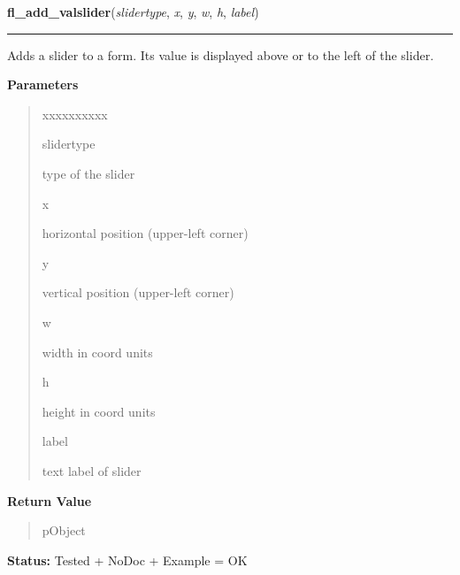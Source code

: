     \label{xformslib:library:fl_add_valslider}

    \vspace{0.5ex}

\hspace{.8\funcindent}\begin{boxedminipage}{\funcwidth}

    \raggedright \textbf{fl\_add\_valslider}(\textit{slidertype}, \textit{x}, \textit{y}, \textit{w}, \textit{h}, \textit{label})

    \vspace{-1.5ex}

    \rule{\textwidth}{0.5\fboxrule}
\setlength{\parskip}{2ex}
    Adds a slider to a form. Its value is displayed above or to the left of
    the slider.

\setlength{\parskip}{1ex}
      \textbf{Parameters}
      \vspace{-1ex}

      \begin{quote}
        \begin{Ventry}{xxxxxxxxxx}

          \item[slidertype]

          type of the slider

          \item[x]

          horizontal position (upper-left corner)

          \item[y]

          vertical position (upper-left corner)

          \item[w]

          width in coord units

          \item[h]

          height in coord units

          \item[label]

          text label of slider

        \end{Ventry}

      \end{quote}

      \textbf{Return Value}
    \vspace{-1ex}

      \begin{quote}
      pObject

      \end{quote}

\textbf{Status:} Tested + NoDoc + Example = OK



    \end{boxedminipage}

